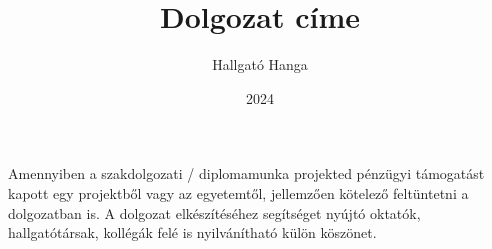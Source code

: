 \documentclass[
]{elteikthesis}[2024/04/26]
\title{Dolgozat címe} %
\date{2024} %
\author{Hallgató Hanga}
\affiliation{egyetemi tanársegéd} %
\begin{document}


\maketitle
%

\tableofcontents
\cleardoublepage


\cleardoublepage


\cleardoublepage


\cleardoublepage


\cleardoublepage

\chapter*{\acklabel}
Amennyiben a szakdolgozati / diplomamunka projekted pénzügyi támogatást kapott egy projektből vagy az egyetemtől, jellemzően kötelező feltüntetni a dolgozatban is. A dolgozat elkészítéséhez segítséget nyújtó oktatók, hallgatótársak, kollégák felé is nyilvánítható külön köszönet.

\appendix

\cleardoublepage

{}
\printbibliography[title=\biblabel]
\cleardoublepage

{}
\listoffigures
\cleardoublepage

{}
\listoftables
\cleardoublepage

{}
\listofalgorithms
\cleardoublepage

{}
\lstlistoflistings
\cleardoublepage

\end{document}

